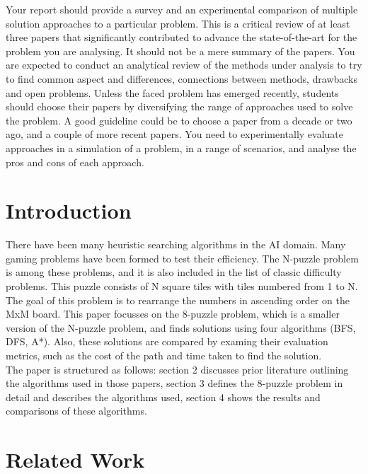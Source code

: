 \documentclass{svproc}
\begin{document}
Your report should provide a survey and an experimental comparison of multiple solution approaches to a particular problem. This is a critical review of at least three papers that significantly contributed to advance the state-of-the-art for the problem you are analysing. It should not be a mere summary of the papers. You are expected to conduct an analytical review of the methods under analysis to try to find common aspect and differences, connections between methods, drawbacks and open problems. Unless the faced problem has emerged recently, students should choose their papers by diversifying the range of approaches used to solve the problem. A good guideline could be to choose a paper from a decade or two ago, and a couple of more recent papers. You need to experimentally evaluate approaches in a simulation of a problem, in a range of scenarios, and analyse the pros and cons of each approach. 

\section{Introduction}
There have been many heuristic searching algorithms in the AI domain. Many gaming problems have been formed to test their efficiency. The N-puzzle problem is among these problems, and it is also included in the list of classic difficulty problems. This puzzle consists of N square tiles with tiles numbered from 1 to N. The goal of this problem is to rearrange the numbers in ascending order on the MxM board. This paper focusses on the 8-puzzle problem, which is a smaller version of the N-puzzle problem, and finds solutions using four algorithms (BFS, DFS, A*).  Also, these solutions are compared by examing their evaluation metrics, such as the cost of the path and time taken to find the solution. \\

\noindent The paper is structured as follows: section 2 discusses prior literature outlining the algorithms used in those papers,  section 3 defines the 8-puzzle problem in detail and describes the algorithms used, section 4 shows the results and comparisons of these algorithms.

\section{Related Work}
\end{document}
